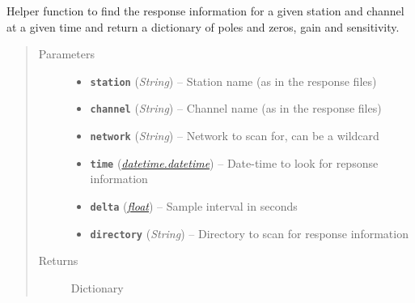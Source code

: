 \documentclass[a4paper,10pt,english]{sphinxmanual}
\begin{document}
\begin{fulllineitems}
\label{submodules/utils.mag_calc:mag_calc._find_resp}
Helper function to find the response information for a given station and
channel at a given time and return a dictionary of poles and zeros, gain
and sensitivity.
\begin{quote}\begin{description}
\item[{Parameters}] \leavevmode\begin{itemize}
\item {} 
\textbf{\texttt{station}} (\emph{String}) -- Station name (as in the response files)

\item {} 
\textbf{\texttt{channel}} (\emph{String}) -- Channel name (as in the response files)

\item {} 
\textbf{\texttt{network}} (\emph{String}) -- Network to scan for, can be a wildcard

\item {} 
\textbf{\texttt{time}} (\href{https://docs.python.org/library/datetime.html\#datetime.datetime}{\emph{datetime.datetime}}) -- Date-time to look for repsonse information

\item {} 
\textbf{\texttt{delta}} (\href{https://docs.python.org/library/functions.html\#float}{\emph{float}}) -- Sample interval in seconds

\item {} 
\textbf{\texttt{directory}} (\emph{String}) -- Directory to scan for response information

\end{itemize}

\item[{Returns}] \leavevmode
Dictionary

\end{description}\end{quote}

\end{fulllineitems}

\end{document}
